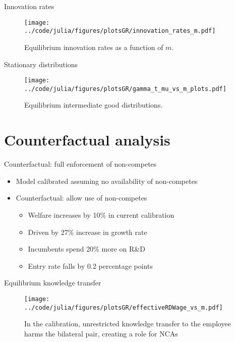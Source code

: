 \documentclass[english,usenames,dvipsnames]{beamer}
\begin{document}
\begin{frame}{Innovation rates}
\begin{figure}
	\texttt{[image: ../code/julia/figures/plotsGR/innovation\_rates\_m.pdf]}
	\caption{Equilibrium innovation rates as a function of $m$.}
\end{figure}
\end{frame}

\begin{frame}{Stationary distributions}
\begin{figure}
	\texttt{[image: ../code/julia/figures/plotsGR/gamma\_t\_mu\_vs\_m\_plots.pdf]}
	\caption{Equilibrium intermediate good distributions.}
	\label{figure:gamma_t_mu_vs_m_plots}
\end{figure}
\end{frame}

\section{Counterfactual analysis}

\begin{frame}
\tableofcontents[currentsection]
\end{frame}

\begin{frame}{Counterfactual: full enforcement of non-competes}
\begin{itemize}
\item Model calibrated assuming no availability of non-competes
\item Counterfactual: allow use of non-competes
\begin{itemize}
\item Welfare increases by 10\% in current calibration
\item Driven by 27\% increase in growth rate
\item Incumbents spend 20\% more on R\&D
\item Entry rate falls by 0.2 percentage points
\end{itemize}
\end{itemize}
\end{frame}

\begin{frame}{Equilibrium knowledge transfer}
\begin{figure}
	\texttt{[image: ../code/julia/figures/plotsGR/effectiveRDWage\_vs\_m.pdf]}
	\caption{In the calibration, unrestricted knowledge transfer to the employee harms the bilateral pair, creating a role for NCAs}
\end{figure}
\end{frame}
\end{document}
